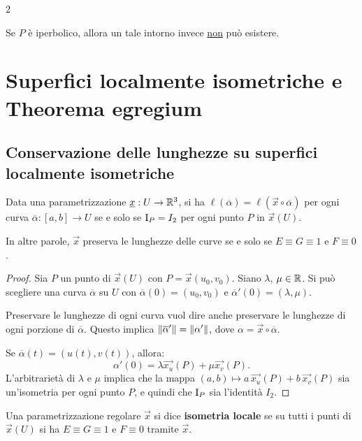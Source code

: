 \begin{multicols*}{2}
\begin{proposition}
        Se $P$ è iperbolico, allora un tale intorno invece \underline{non}
        può esistere.
    \end{proposition}


    \section{Superfici localmente isometriche e Theorema egregium}

    \subsection{Conservazione delle lunghezze su superfici localmente isometriche}

    \begin{proposition}
        Data una parametrizzazione ${\underline{x}} : U \to \mathbb{R}^3$,
        si ha $\ell(\overline{\alpha}) = \ell(\vec{x} \circ \overline{\alpha})$
        per ogni curva $\overline{\alpha} : [a, b] \to U$ se e solo se
        $\mathrm{I}_P = I_2$ per ogni punto $P$ in $\vec{x}(U)$. \smallskip

        In altre parole, $\vec{x}$ preserva le lunghezze delle curve se e solo se
        $E \equiv G \equiv 1$ e $F \equiv 0$.
    \end{proposition}

    \begin{proof}
        Sia $P$ un punto di $\vec{x}(U)$ con $P = \vec{x}(u_0, v_0)$. Siano $\lambda$,
        $\mu \in \mathbb{R}$. Si può scegliere una curva $\overline{\alpha}$ su $U$
        con $\overline{\alpha}(0) = (u_0, v_0)$ e $\overline{\alpha}'(0) = (\lambda, \mu)$. \smallskip

        Preservare le lunghezze di ogni curva vuol dire anche
        preservare le lunghezze di ogni porzione di $\overline{\alpha}$. Questo implica
        $\left\lVert \overline{\alpha}' \right\rVert = \left\lVert \alpha' \right\rVert$, dove $\alpha = \vec{x} \circ \overline{\alpha}$. \smallskip

        Se $\overline{\alpha}(t) = (u(t), v(t))$, allora:
        \[
            \alpha'(0) = \lambda \vec{x_u}(P) + \mu \vec{x_v}(P).
        \]
        L'arbitrarietà di $\lambda$ e $\mu$ implica
        che la mappa $(a, b) \mapsto a \, \vec{x_u}(P) + b \, \vec{x_v}(P)$ sia
        un'isometria per ogni punto $P$,
        e quindi che $\mathrm{I}_P$ sia l'identità $I_2$.
    \end{proof}

    \begin{definition}
        Una parametrizzazione regolare $\vec{x}$ si dice
        \textbf{isometria locale} se su tutti i punti di
        $\vec{x}(U)$ si ha $E \equiv G \equiv 1$ e $F \equiv 0$
        tramite $\vec{x}$.
    \end{definition}


\end{multicols*}
